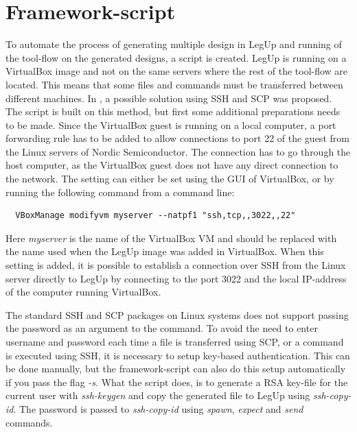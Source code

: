 \section{\label{sec:hlsscript}Framework-script}
To automate the process of generating multiple design in LegUp and running of the tool-flow on the generated designs, a script is created. LegUp is running on a VirtualBox image and not on the same servers where the rest of the tool-flow are located. This means that some files and commands must be transferred between different machines. In \cite{holm2015pro}, a possible solution using SSH and SCP was proposed. The script is built on this method, but first some additional preparations needs to be made. Since the VirtualBox guest is running on a local computer, a port forwarding rule has to be added to allow connections to port 22 of the guest from the Linux servers of Nordic Semiconductor. The connection has to go through the host computer, as the VirtualBox guest does not have any direct connection to the network. The setting can either be set using the GUI of VirtualBox, or by running the following command from a command line:
\begin{verbatim}
  VBoxManage modifyvm myserver --natpf1 "ssh,tcp,,3022,,22"  
\end{verbatim}
Here \textit{myserver} is the name of the VirtualBox VM and should be replaced with the name used when the LegUp image was added in VirtualBox. When this setting is added, it is possible to establish a connection over SSH from the Linux server directly to LegUp by connecting to the port 3022 and the local IP-address of the computer running VirtualBox.

The standard SSH and SCP packages on Linux systems does not support passing the password as an argument to the command. To avoid the need to enter username and password each time a file is transferred using SCP, or a command is executed using SSH, it is necessary to setup key-based authentication. This can be done manually, but the framework-script can also do this setup automatically if you pass the flag \textit{-s}. What the script does, is to generate a RSA key-file for the current user with \textit{ssh-keygen} and copy the generated file to LegUp using \textit{ssh-copy-id}. The password is passed to \textit{ssh-copy-id} using \textit{spawn}, \textit{expect} and \textit{send} commands.

